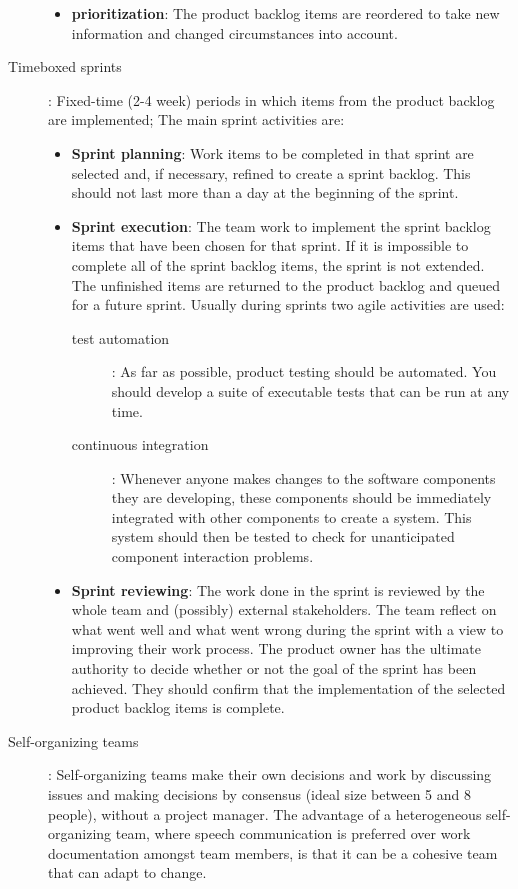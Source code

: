 \begin{description}
\begin{itemize}
{                  }
            \item \textbf{prioritization}: The product backlog items are reordered to take new information and changed circumstances into account.
         \end{itemize}
   \item[Timeboxed sprints]: Fixed-time (2-4 week) periods in which items from the product backlog are implemented;
         The main sprint activities are:
         \begin{itemize}
            \item \textbf{Sprint planning}: Work items to be completed in that sprint are selected and, if necessary, refined to create a sprint backlog. This should not last more than a day at the beginning of the sprint.
            \item \textbf{Sprint execution}: The team work to implement the sprint backlog items that have been chosen for that sprint. If it is impossible to complete all of the sprint backlog items, the sprint is not extended. The unfinished items are returned to the product backlog and queued for a future sprint.
                  Usually during sprints two agile activities are used:
                  \begin{description}
                     \item[test automation]: As far as possible, product testing should be automated. You should develop a suite of executable tests that can be run at any time.
                     \item[continuous integration]: Whenever anyone makes changes to the software components they are developing, these components should be immediately integrated with other components to create a system. This system should then be tested to check for unanticipated component interaction problems.
                  \end{description}
            \item \textbf{Sprint reviewing}: The work done in the sprint is reviewed by the whole team and (possibly) external stakeholders. The team reflect on what went well and what went wrong during the sprint with a view to improving their work process. The product owner has the ultimate authority to decide whether or not the goal of the sprint has been achieved. They should confirm that the implementation of the selected product backlog items is complete.
         \end{itemize}
   \item[Self-organizing teams]: Self-organizing teams make their own decisions and work by discussing issues and making decisions by consensus (ideal size between 5 and 8 people), without a project manager. The advantage of a heterogeneous self-organizing team, where speech communication is preferred over work documentation amongst team members, is that it can be a cohesive team that can adapt to change.

\end{description}
